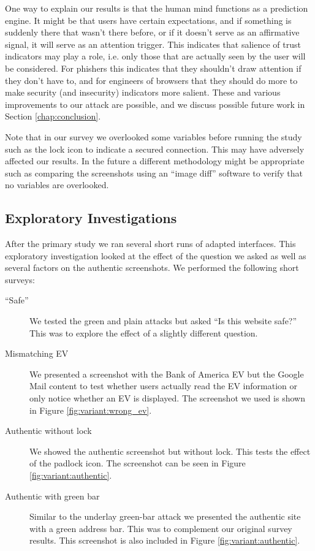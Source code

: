 \documentclass[twoside,letterpaper]{soups}
\begin{document}
One way to explain our results is that the human mind functions as a prediction engine. It might be that users have certain expectations, and if something is suddenly there that wasn't there before,  or if it doesn't serve as an affirmative signal, it will serve as an attention trigger. This indicates that salience of trust indicators may play a role, i.e. only those that are actually seen by the user will be considered. For phishers this indicates that they shouldn't draw attention if they don't have to, and for engineers of browsers that they should do more to make security (and insecurity) indicators more salient. These and various improvements to our attack are possible, and we discuss possible future work in Section \ref{chap:conclusion}. %

Note that in our survey we overlooked some variables before running the study such as the lock icon to indicate a secured connection. This may have adversely affected our results. In the future a different methodology might be appropriate such as comparing the screenshots using an ``image diff'' software to verify that no variables are overlooked.

\subsection{Exploratory Investigations} \label{sect:exploratory}

After the primary study we ran several short runs of adapted interfaces. This exploratory investigation looked at the effect of the question we asked as well as several factors on the authentic screenshots. We performed the following short surveys:

\begin{description}

\item[``Safe'']
We tested the green and plain attacks but asked ``Is this website safe?'' This was to explore the effect of a slightly different question.

\item[Mismatching EV]
We presented a screenshot with the Bank of America EV but the Google Mail content to test whether users actually read the EV information or only notice whether an EV is displayed. The screenshot we used is shown in Figure \ref{fig:variant:wrong_ev}.

\item[Authentic without lock]
We showed the authentic screenshot but without lock. This tests the effect of the padlock icon. The screenshot can be seen in Figure \ref{fig:variant:authentic}.

\item[Authentic with green bar]
Similar to the underlay green-bar attack we presented the authentic site with a green address bar. This was to complement our original survey results. This screenshot is also included in Figure \ref{fig:variant:authentic}.

\end{description}
\end{document}

